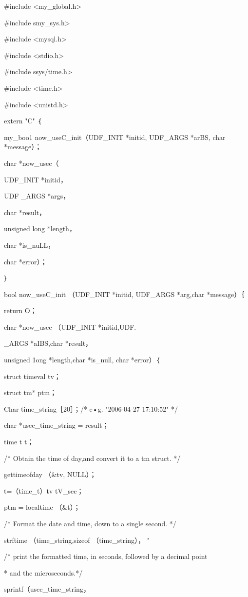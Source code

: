 #include <my\_global.h>

#include smy\_sys.h>

#include <mysql.h>

#include <stdio.h>

#include ssys/time.h>

#include <time.h>

#include <unistd.h>

extern "C" ｛

my\_boo1 now\_useC\_init（UDF\_INIT *initid, UDF\_ARGS *arBS, char *message）；

char *now\_usec（

UDF\_INIT *initid，

UDF \_ARGS *args，

char *result，

unsigned long *length，

char *is\_nuLL，

char *error）；

｝

bool now\_useC\_init （UDF\_INIT *initid, UDF\_ARGS *arg,char *message）｛

return O；

char *now\_usec （UDF\_INIT *initid,UDF.

\_ARGS *aIBS,char *result，

unsigned 1ong *length,char *is\_null, char *error）｛

struct timeval tv；

struct tm* ptm；

Char time\_string［20］；/* e•g. "2006-04-27 17:10:52" */

char *usec\_time\_string = result；

time t t；

/* Obtain the time of day,and convert it to a tm struct. */

gettimeofday （&tv, NULL）；

t=（time\_t）tv tV\_sec；

ptm = localtime （&t）；

/* Format the date and time, down to a single second. */

strftime （time\_string,sizeof （time\_string）， "%

/* print the formatted time, in seconds, followed by a decimal point

* and the microseconds.*/

sprintf（usec\_time\_string，

